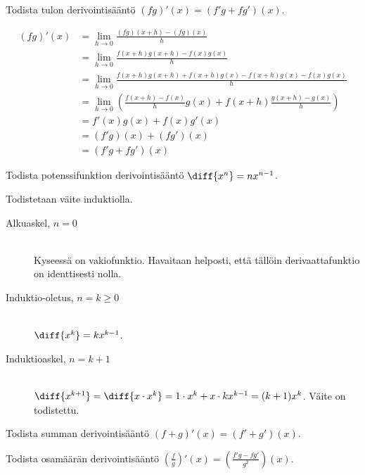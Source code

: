 
\begin{esimerkki}
	Todista tulon derivointisääntö $(fg)'(x) = (f'g+fg')(x)$.
	\begin{esimratk}
		\begin{align*}
			(fg)'(x) &= \lim\limits_{h \to 0} \frac{(fg)(x+h)-(fg)(x)}{h} \\
					 &= \lim\limits_{h \to 0} \frac{f(x+h)g(x+h)-f(x)g(x)}{h} \\
					 &= \lim\limits_{h \to 0} \frac{f(x+h)g(x+h)+f(x+h)g(x)-f(x+h)g(x)-f(x)g(x)}{h} \\
					 &= \lim\limits_{h \to 0} (\frac{f(x+h)-f(x)}{h} g(x) + f(x+h) \frac{g(x+h)-g(x)}{h}) \\
					 &= f'(x)g(x) + f(x)g'(x) \\
					 &= (f'g)(x) + (fg')(x) \\
					 &= (f'g + fg')(x)
		\end{align*}
	\end{esimratk}
\end{esimerkki}


\begin{esimerkki}
	Todista potenssifunktion derivointisääntö $\diff{x^n} = nx^{n-1}$.
	\begin{esimratk}
		Todistetaan väite induktiolla.
		\begin{description}
			\item[Alkuaskel, $n=0$] \hfill \\
			Kyseessä on vakiofunktio. Havaitaan helposti, että tällöin derivaattafunktio on identtisesti nolla.
			\item[Induktio-oletus, $n=k\geq0$] \hfill \\
			$\diff{x^k} = kx^{k-1}$.
			\item[Induktioaskel, $n=k+1$] \hfill \\
			$\diff{x^{k+1}} = \diff{x \cdot x^k} = 1 \cdot x^k + x \cdot kx^{k-1} = (k+1)x^k$. Väite on todistettu.
		\end{description}
	\end{esimratk}
\end{esimerkki}

\begin{tehtavasivu}

\begin{tehtava}
	Todista summan derivointisääntö $(f+g)'(x) = (f'+g')(x)$.
\end{tehtava}

\begin{tehtava}
	Todista osamäärän derivointisääntö $(\frac{f}{g})'(x) = (\frac{f'g-fg'}{g^2})(x)$.
\end{tehtava}

\end{tehtavasivu}
